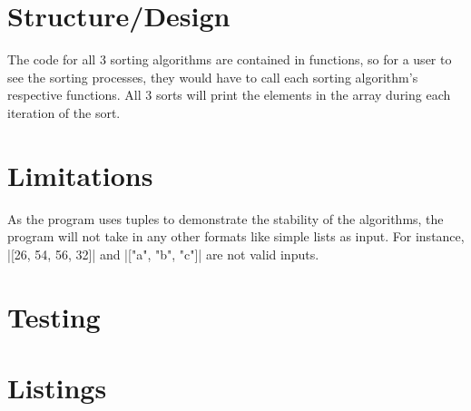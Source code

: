 \documentclass{report}
\begin{document}
\section{Structure/Design}
The code for all 3 sorting algorithms are contained in functions, so for a user to see the sorting processes, they would have to call each sorting algorithm's respective functions. All 3 sorts will print the elements in the array during each iteration of the sort.
\section{Limitations}
As the program uses tuples to demonstrate the stability of the algorithms, the program will not take in any other formats like simple lists as input. For instance, |[26, 54, 56, 32]| and |["a", "b", "c"]| are not valid inputs.
\section{Testing}
\section{Listings}
\end{document}
